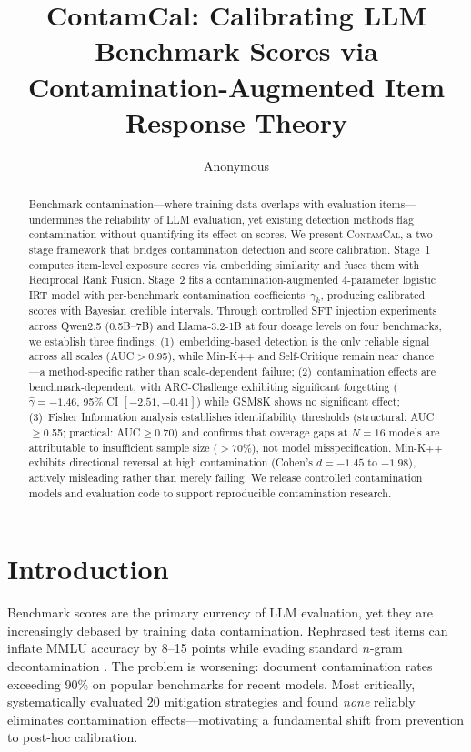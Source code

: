 \documentclass[11pt,a4paper]{article}
\title{ContamCal: Calibrating LLM Benchmark Scores via\\Contamination-Augmented Item Response Theory}
\author{Anonymous}
\newcommand{\ghat}{\hat{\gamma}}
\newcommand{\contamcal}{\textsc{ContamCal}}
\begin{document}
\maketitle

\begin{abstract}
Benchmark contamination---where training data overlaps with evaluation items---undermines the reliability of LLM evaluation, yet existing detection methods flag contamination without quantifying its effect on scores. We present \contamcal{}, a two-stage framework that bridges contamination detection and score calibration. Stage~1 computes item-level exposure scores via embedding similarity and fuses them with Reciprocal Rank Fusion. Stage~2 fits a contamination-augmented 4-parameter logistic IRT model with per-benchmark contamination coefficients~$\gamma_k$, producing calibrated scores with Bayesian credible intervals. Through controlled SFT injection experiments across Qwen2.5 (0.5B--7B) and Llama-3.2-1B at four dosage levels on four benchmarks, we establish three findings: (1)~embedding-based detection is the only reliable signal across all scales (AUC${}>{}$0.95), while Min-K++ and Self-Critique remain near chance---a method-specific rather than scale-dependent failure; (2)~contamination effects are benchmark-dependent, with ARC-Challenge exhibiting significant forgetting ($\ghat=-1.46$, 95\% CI $[-2.51,-0.41]$) while GSM8K shows no significant effect; (3)~Fisher Information analysis establishes identifiability thresholds (structural: AUC${\geq}$0.55; practical: AUC${\geq}$0.70) and confirms that coverage gaps at $N{=}16$ models are attributable to insufficient sample size (${>}70$\%), not model misspecification. Min-K++ exhibits directional reversal at high contamination (Cohen's $d=-1.45$ to $-1.98$), actively misleading rather than merely failing. We release controlled contamination models and evaluation code to support reproducible contamination research.
\end{abstract}

\section{Introduction}
\label{sec:intro}

Benchmark scores are the primary currency of LLM evaluation, yet they are increasingly debased by training data contamination. Rephrased test items can inflate MMLU accuracy by 8--15 points while evading standard $n$-gram decontamination \cite{xu2024benchmark}. The problem is worsening: \citet{balloccu2024leak} document contamination rates exceeding 90\% on popular benchmarks for recent models. Most critically, \citet{xu2025emperor} systematically evaluated 20 mitigation strategies and found \emph{none} reliably eliminates contamination effects---motivating a fundamental shift from prevention to post-hoc calibration.
\end{document}
